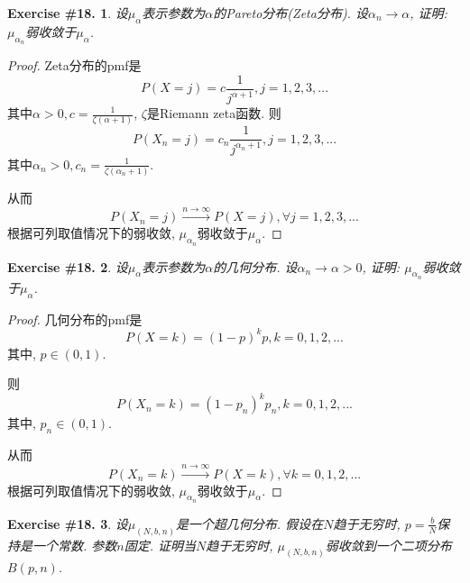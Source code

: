 \documentclass[UTF8, a4paper]{article}
\newtheorem{exercise}{Exercise \#18.}
\begin{document}
\begin{framed}
\begin{exercise}
设\(\mu_\alpha\)表示参数为\(\alpha\)的Pareto分布(Zeta分布). 设\(\alpha_n \to \alpha\), 证明: \(\mu_{\alpha_n}\)弱收敛于\(\mu_{\alpha}\).
\end{exercise}
\end{framed}

\begin{proof}
Zeta分布的pmf是
$$
P(X = j) = c \frac{1}{j^{\alpha + 1}}, j = 1,2,3,...
$$
其中\(\alpha > 0, c = \frac{1}{\zeta(\alpha + 1)}\), \(\zeta\)是Riemann zeta函数.
则 
$$
P(X_n = j) = c_n \frac{1}{j^{\alpha_n + 1}}, j = 1,2,3,...
$$
其中\(\alpha_n > 0, c_n = \frac{1}{\zeta(\alpha_n + 1)}\).

从而
$$
P(X_n = j) \xrightarrow{n\to\infty} P(X = j), \forall j = 1,2,3,...
$$
根据可列取值情况下的弱收敛, \(\mu_{\alpha_n}\)弱收敛于\(\mu_{\alpha}\).
\end{proof}



\begin{framed}
    \begin{exercise}
设\(\mu_\alpha\)表示参数为\(\alpha\)的几何分布. 设\(\alpha_n \to \alpha > 0\), 证明: \(\mu_{\alpha_n}\)弱收敛于\(\mu_{\alpha}\).
\end{exercise}
\end{framed}

\begin{proof}
几何分布的pmf是
$$
P(X = k) = (1 - p)^k p, k = 0,1,2,...
$$
其中, \(p \in (0,1)\).

则
$$
P(X_n = k) = (1 - p_n)^k p_n, k = 0,1,2,...
$$
其中, \(p_n \in (0, 1)\).

从而
$$
P(X_n = k) \xrightarrow{n\to\infty} P(X = k), \forall k = 0,1,2,...
$$
根据可列取值情况下的弱收敛, \(\mu_{\alpha_n}\)弱收敛于\(\mu_{\alpha}\).
\end{proof}


\begin{framed}
\begin{exercise}
设\(\mu_{(N,b,n)}\)是一个超几何分布. 假设在\(N\)趋于无穷时, \(p = \frac{b}{N}\)保持是一个常数.
参数\(n\)固定. 证明当\(N\)趋于无穷时, \(\mu_{(N,b,n)}\)弱收敛到一个二项分布\(B(p,n)\).
\end{exercise}
\end{framed}
\end{document}
